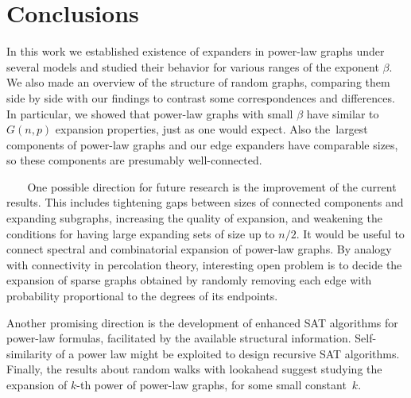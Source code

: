 \chapter{Conclusions}

In this work we established existence of expanders in power-law graphs
under several models and studied their behavior for various ranges
of the exponent $\beta$.
We also made an overview of the structure of random graphs, comparing them
side by side with our findings to contrast some correspondences and differences.
In particular, we showed that power-law graphs with small $\beta$
have similar to $G(n,p)$ expansion properties, just as one would expect.
Also the~largest components of power-law graphs and our edge expanders
have comparable sizes, so these components are presumably well-connected.

\begin{shaded}
$\quad\;\;$
One possible direction for future research is the improvement of the current results.
This includes tightening gaps between sizes of connected components and expanding subgraphs,
increasing the quality of expansion,
and weakening the conditions for having large expanding sets of size up to $n/2$.
It would be useful to connect spectral and combinatorial expansion of power-law graphs.
By analogy with connectivity in percolation theory, interesting open problem is
to decide the expansion of sparse graphs obtained by randomly removing each edge
with probability proportional to the degrees of its endpoints.

Another promising direction is  the development of enhanced SAT algorithms
for power-law formulas, facilitated by the available structural information.
Self-similarity of a power law might be exploited to design recursive SAT algorithms.
Finally, the results about random walks with lookahead suggest studying
the expansion of $k$-th power of power-law graphs, for some small constant~$k$.
\end{shaded}
